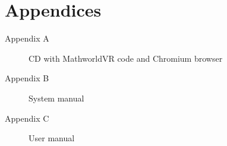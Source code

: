 \section*{Appendices}
\thispagestyle{empty}

\begin{description}
	\item[Appendix A] CD with MathworldVR code and Chromium browser
	\item[Appendix B] System manual
	\item[Appendix C] User manual
\end{description}
